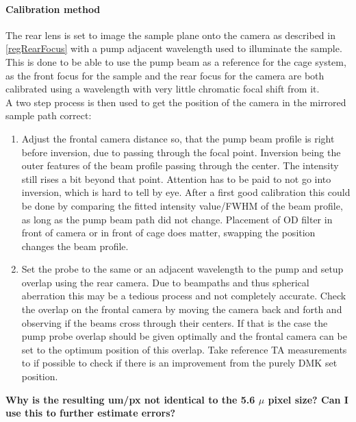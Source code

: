 \documentclass[twoside,openright]{scrreprt}
\begin{document}
\paragraph{Calibration method}
The rear lens is set to image the sample plane onto the camera as described in \ref{regRearFocus} with a pump adjacent wavelength used to illuminate the sample. This is done to be able to use the pump beam as a reference for the cage system, as the front focus for the sample and the rear focus for the camera are both calibrated using a wavelength with very little chromatic focal shift from it.\\
A two step process is then used to get the position of the camera in the mirrored sample path correct:
\begin{enumerate}
\item Adjust the frontal camera distance so, that the pump beam profile is right before inversion, due to passing through the focal point. Inversion being the outer features of the beam profile passing through the center. The intensity still rises a bit beyond that point. Attention has to be paid to not go into inversion, which is hard to tell by eye. After a first good calibration this could be done by comparing the fitted intensity value/FWHM of the beam profile, as long as the pump beam path did not change. Placement of OD filter in front of camera or in front of cage does matter, swapping the position changes the beam profile.
\item Set the probe to the same or an adjacent wavelength to the pump and setup overlap using the rear camera. Due to beampaths and thus spherical aberration this may be a tedious process and not completely accurate. Check the overlap on the frontal camera by moving the camera back and forth and observing if the beams cross through their centers. If that is the case the pump probe overlap should be given optimally and the frontal camera can be set to the optimum position of this overlap. Take reference TA measurements to if possible to check if there is an improvement from the purely DMK set position.
\end{enumerate}

\textbf{Why is the resulting um/px not identical to the 5.6 $\mu$ pixel size? Can I use this to further estimate errors?}
\end{document}
